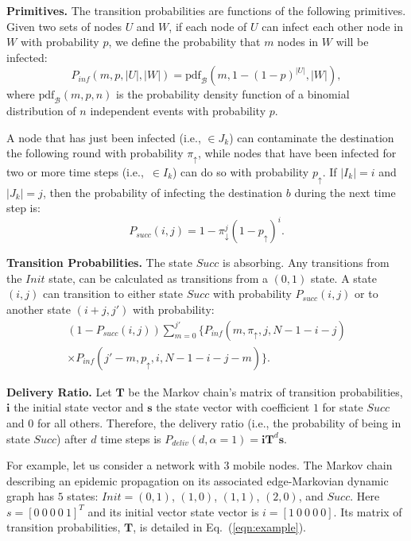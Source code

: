 \documentclass[final,journal,letterpaper]{IEEEtran}
\begin{document}
\noindent\textbf{Primitives.} The transition probabilities are functions of the following primitives. Given two sets of nodes $U$ and $W$, if each node of $U$ can infect each other node in $W$ with probability $p$, we define the probability that $m$ nodes in $W$ will be infected:
\begin{equation}
P_{inf}(m,p,|U|,|W|) = \textrm{pdf}_{\mathcal{B}}\left(m,1-(1-p)^{|U|},|W|\right),
\end{equation}
\noindent where $\textrm{pdf}_{\mathcal{B}}(m,p,n)$ is the probability density function of a binomial distribution of $n$ independent events with probability $p$.

A node that has just been infected (i.e., $\in J_k$) can contaminate the destination the following round with probability $\pi_\uparrow$, while nodes that have been infected for two or more time steps (i.e.,~$\in I_k$) can do so with probability $p_\uparrow$. If $|I_k|=i$ and $|J_k|=j$, then the probability of infecting the destination $b$ during the next time step is:
\begin{equation}
P_{succ}(i,j) = 1 - \pi_\downarrow^j (1-p_\uparrow)^i.
\label{p_succ}
\end{equation}

\noindent\textbf{Transition Probabilities.} The state $Succ$ is absorbing. Any transitions from the $Init$ state, can be calculated as transitions from a $(0,1)$ state. A state $(i,j)$ can transition to either state $Succ$ with probability $P_{succ}(i,j)$ or to another state $(i+j,j')$ with probability:
\begin{eqnarray}
\left( 1-P_{succ}(i,j) \right) \sum_{m=0}^{j'} \Big\{ P_{inf}(m,\pi_\uparrow,j,N-1-i-j) \nonumber \\ 
\times P_{inf}(j'-m,p_\uparrow,i,N-1-i-j-m) \Big\}. \label{p_trans}
\end{eqnarray}

\noindent\textbf{Delivery Ratio.} Let $\mathbf{T}$ be the Markov chain's matrix of transition probabilities, $\mathbf{i}$ the initial state vector and $\mathbf{s}$ the state vector with coefficient $1$ for state $Succ$ and $0$ for all others.  Therefore, the delivery ratio (i.e., the probability of being in state $Succ$) after $d$ time steps is \mbox{$P_{deliv}( d, \alpha = 1 ) = \mathbf{i} \mathbf{T}^d \mathbf{s}$}.

For example, let us consider a network with $3$ mobile nodes. The Markov chain describing an epidemic propagation on its associated edge-Markovian dynamic graph has $5$ states: $Init = (0,1)$, $(1,0)$, $(1,1)$, $(2,0)$, and $Succ$. Here $s = [0 \: 0 \: 0 \: 0 \: 1]^T$ and its initial vector state vector is $i = [1 \: 0 \: 0 \: 0 \: 0]$. Its matrix of transition probabilities, $\mathbf{T}$, is detailed in Eq.~(\ref{eqn:example}).
\end{document}
